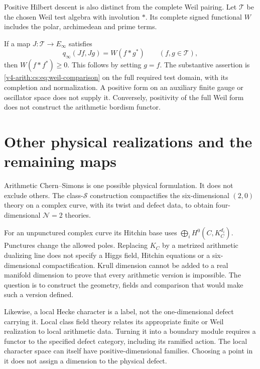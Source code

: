 Positive Hilbert descent is also distinct from the complete Weil pairing.
Let \(\mathcal T\) be the chosen Weil test algebra with involution \(*\).
Its complete signed functional \(W\) includes the polar, archimedean and
prime terms.

If a map \(J:\mathcal T\to E_\infty\) satisfies
\begin{equation}
 q_\infty(Jf,Jg)=W(f*g^*)
                \qquad(f,g\in\mathcal T),
 \label{v4-arith:cs:eq:weil-comparison}
\end{equation}
then \(W(f*f^*)\ge0\). This follows by setting \(g=f\). The substantive
assertion is \eqref{v4-arith:cs:eq:weil-comparison} on the full required
test domain, with its completion and normalization. A positive form on an
auxiliary finite gauge or oscillator space does not supply it. Conversely,
positivity of the full Weil form does not construct the arithmetic bordism
functor.

\section{Other physical realizations and the remaining maps}
\label{v4-arith:cs:remaining}

Arithmetic Chern--Simons is one possible physical formulation. It does not
exclude others. The class-\(\mathcal S\) construction compactifies the
six-dimensional \((2,0)\) theory on a complex curve, with its twist and
defect data, to obtain four-dimensional \(\mathcal N=2\) theories.

For an unpunctured complex curve its Hitchin base uses
\(\bigoplus_iH^0(C,K_C^{d_i})\). Punctures change the allowed poles.
Replacing \(K_C\) by a metrized arithmetic dualizing line does not specify a
Higgs field, Hitchin equations or a six-dimensional compactification. Krull
dimension cannot be added to a real manifold dimension to prove that every
arithmetic version is impossible. The question is to construct the geometry,
fields and comparison that would make such a version defined.

Likewise, a local Hecke character is a label, not the one-dimensional defect
carrying it. Local class field theory relates its appropriate finite or Weil
realization to local arithmetic data. Turning it into a boundary module
requires a functor to the specified defect category, including its ramified
action. The local character space can itself have positive-dimensional
families. Choosing a point in it does not assign a dimension to the physical
defect.

